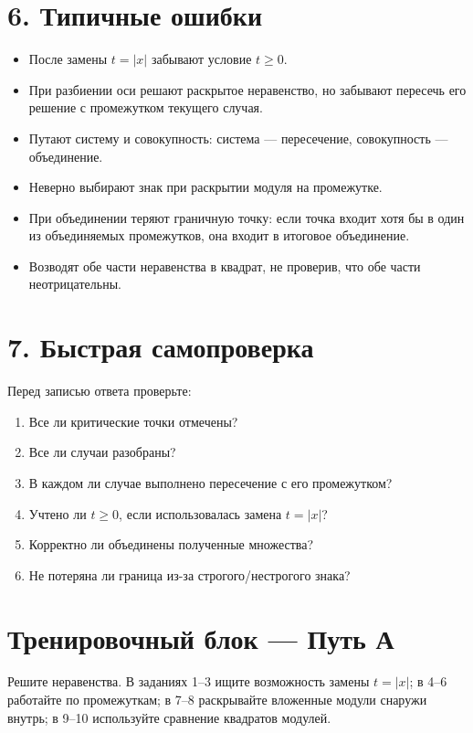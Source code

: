 \documentclass[a4paper,12pt]{article}
\newcommand{\sectionline}{\par\vspace{0.25em}{\color{accent}\hrule height 0.7pt}\vspace{0.7em}}
\begin{document}
\section*{6. Типичные ошибки}
\sectionline
\begin{itemize}
  \item После замены $t=|x|$ забывают условие $t\ge0$.
  \item При разбиении оси решают раскрытое неравенство, но забывают пересечь его решение с промежутком текущего случая.
  \item Путают систему и совокупность: система --- пересечение, совокупность --- объединение.
  \item Неверно выбирают знак при раскрытии модуля на промежутке.
  \item При объединении теряют граничную точку: если точка входит хотя бы в один из объединяемых промежутков, она входит в итоговое объединение.
  \item Возводят обе части неравенства в квадрат, не проверив, что обе части неотрицательны.
\end{itemize}

\section*{7. Быстрая самопроверка}
\sectionline
Перед записью ответа проверьте:
\begin{enumerate}
  \item Все ли критические точки отмечены?
  \item Все ли случаи разобраны?
  \item В каждом ли случае выполнено пересечение с его промежутком?
  \item Учтено ли $t\ge0$, если использовалась замена $t=|x|$?
  \item Корректно ли объединены полученные множества?
  \item Не потеряна ли граница из-за строгого/нестрогого знака?
\end{enumerate}

\clearpage
\section*{Тренировочный блок — Путь А}
\sectionline
Решите неравенства. В заданиях 1--3 ищите возможность замены $t=|x|$; в 4--6 работайте по промежуткам; в 7--8 раскрывайте вложенные модули снаружи внутрь; в 9--10 используйте сравнение квадратов модулей.
\end{document}
